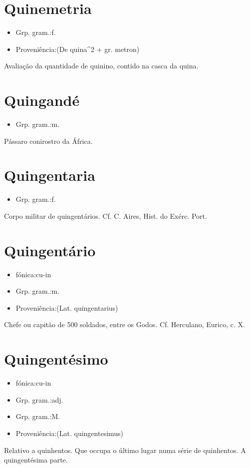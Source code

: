 \section{Quinemetria}
\begin{itemize}
\item {Grp. gram.:f.}
\end{itemize}
\begin{itemize}
\item {Proveniência:(De \textunderscore quina\textunderscore ^2 + gr. \textunderscore metron\textunderscore )}
\end{itemize}
Avaliação da quantidade de quinino, contido na casca da quina.
\section{Quingandé}
\begin{itemize}
\item {Grp. gram.:m.}
\end{itemize}
Pássaro conirostro da África.
\section{Quingentaria}
\begin{itemize}
\item {Grp. gram.:f.}
\end{itemize}
Corpo militar de quingentários. Cf. C. Aires, \textunderscore Hist. do Exérc. Port.\textunderscore 
\section{Quingentário}
\begin{itemize}
\item {fónica:cu-in}
\end{itemize}
\begin{itemize}
\item {Grp. gram.:m.}
\end{itemize}
\begin{itemize}
\item {Proveniência:(Lat. \textunderscore quingentarius\textunderscore )}
\end{itemize}
Chefe ou capitão de 500 soldados, entre os Godos. Cf. Herculano, \textunderscore Eurico\textunderscore , c. X.
\section{Quingentésimo}
\begin{itemize}
\item {fónica:cu-in}
\end{itemize}
\begin{itemize}
\item {Grp. gram.:adj.}
\end{itemize}
\begin{itemize}
\item {Grp. gram.:M.}
\end{itemize}
\begin{itemize}
\item {Proveniência:(Lat. \textunderscore quingentesimus\textunderscore )}
\end{itemize}
Relativo a quinhentos.
Que occupa o último lugar numa série de quinhentos.
A quingentésima parte.
